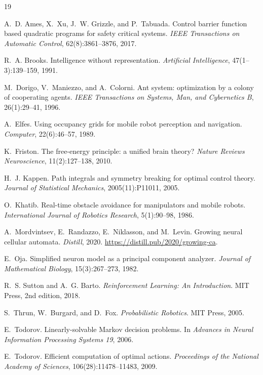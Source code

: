 \documentclass[11pt]{article}
\begin{document}
\begin{thebibliography}{19}\setlength{\itemsep}{0pt}

A.~D. Ames, X.~Xu, J.~W. Grizzle, and P.~Tabuada.
Control barrier function based quadratic programs for safety critical systems.
\emph{IEEE Transactions on Automatic Control}, 62(8):3861--3876, 2017.

R.~A. Brooks.
Intelligence without representation.
\emph{Artificial Intelligence}, 47(1--3):139--159, 1991.

M.~Dorigo, V.~Maniezzo, and A.~Colorni.
Ant system: optimization by a colony of cooperating agents.
\emph{IEEE Transactions on Systems, Man, and Cybernetics B}, 26(1):29--41, 1996.

A.~Elfes.
Using occupancy grids for mobile robot perception and navigation.
\emph{Computer}, 22(6):46--57, 1989.

K.~Friston.
The free-energy principle: a unified brain theory?
\emph{Nature Reviews Neuroscience}, 11(2):127--138, 2010.

H.~J. Kappen.
Path integrals and symmetry breaking for optimal control theory.
\emph{Journal of Statistical Mechanics}, 2005(11):P11011, 2005.

O.~Khatib.
Real-time obstacle avoidance for manipulators and mobile robots.
\emph{International Journal of Robotics Research}, 5(1):90--98, 1986.

A.~Mordvintsev, E.~Randazzo, E.~Niklasson, and M.~Levin.
Growing neural cellular automata.
\emph{Distill}, 2020. \url{https://distill.pub/2020/growing-ca}.

E.~Oja.
Simplified neuron model as a principal component analyzer.
\emph{Journal of Mathematical Biology}, 15(3):267--273, 1982.

R.~S. Sutton and A.~G. Barto.
\emph{Reinforcement Learning: An Introduction}.
MIT Press, 2nd edition, 2018.

S.~Thrun, W.~Burgard, and D.~Fox.
\emph{Probabilistic Robotics}.
MIT Press, 2005.

E.~Todorov.
Linearly-solvable Markov decision problems.
In \emph{Advances in Neural Information Processing Systems 19}, 2006.

E.~Todorov.
Efficient computation of optimal actions.
\emph{Proceedings of the National Academy of Sciences}, 106(28):11478--11483, 2009.

\end{thebibliography}
\end{document}
